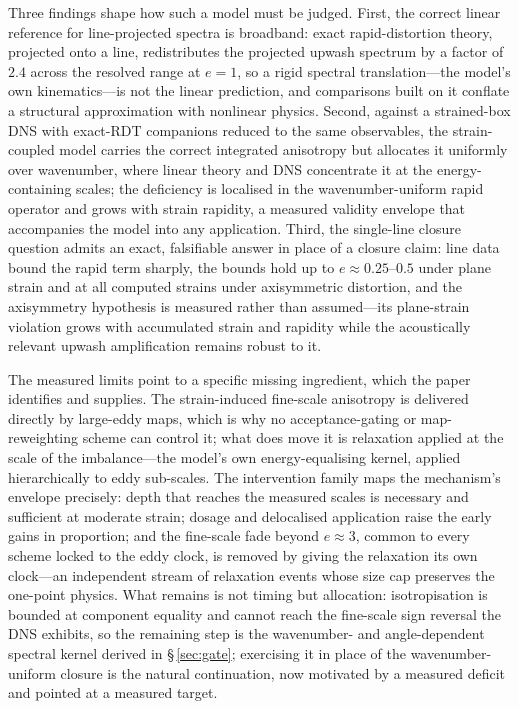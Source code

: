 \documentclass[lineno]{JFM-FLM_Au}
\begin{document}
Three findings shape how such a model must be judged. First, the
correct linear reference for line-projected spectra is broadband: exact
rapid-distortion theory, projected onto a line, redistributes the
projected upwash spectrum by a factor of $2.4$ across the resolved range
at $e=1$, so a rigid spectral translation---the model's own
kinematics---is not the linear prediction, and comparisons built on it
conflate a structural approximation with nonlinear physics. Second,
against a strained-box DNS with exact-RDT companions reduced to the
same observables, the strain-coupled model carries the correct
integrated anisotropy but allocates it uniformly over wavenumber, where
linear theory and DNS concentrate it at the energy-containing scales;
the deficiency is localised in the wavenumber-uniform rapid operator
and grows with strain rapidity, a measured validity envelope that
accompanies the model into any application. Third, the single-line
closure question admits an exact, falsifiable answer in place of a
closure claim: line data bound the rapid term sharply, the bounds hold up to $e\approx0.25$--$0.5$ under plane strain and at all
computed strains under axisymmetric distortion, and the axisymmetry
hypothesis is measured rather than assumed---its plane-strain violation
grows with accumulated strain and rapidity while the acoustically
relevant upwash amplification remains robust to it.

The measured limits point to a specific missing ingredient, which the
paper identifies and supplies. The strain-induced fine-scale
anisotropy is delivered directly by large-eddy maps, which is why no
acceptance-gating or map-reweighting scheme can control it; what does
move it is relaxation applied at the scale of the imbalance---the
model's own energy-equalising kernel, applied hierarchically to eddy
sub-scales. The intervention family maps the mechanism's envelope
precisely: depth that reaches the measured scales is necessary and
sufficient at moderate strain; dosage and delocalised application
raise the early gains in proportion; and the fine-scale fade beyond
$e\approx3$, common to every scheme locked to the eddy clock, is
removed by giving the relaxation its own clock---an independent stream
of relaxation events whose size cap preserves the one-point
physics. What remains is not timing but allocation: isotropisation is
bounded at component equality and cannot reach the fine-scale sign
reversal the DNS exhibits, so the remaining step is the
wavenumber- and angle-dependent spectral kernel derived in
\S\,\ref{sec:gate}; exercising it in place of the wavenumber-uniform
closure is the natural continuation, now motivated by a measured
deficit and pointed at a measured target.
\end{document}
